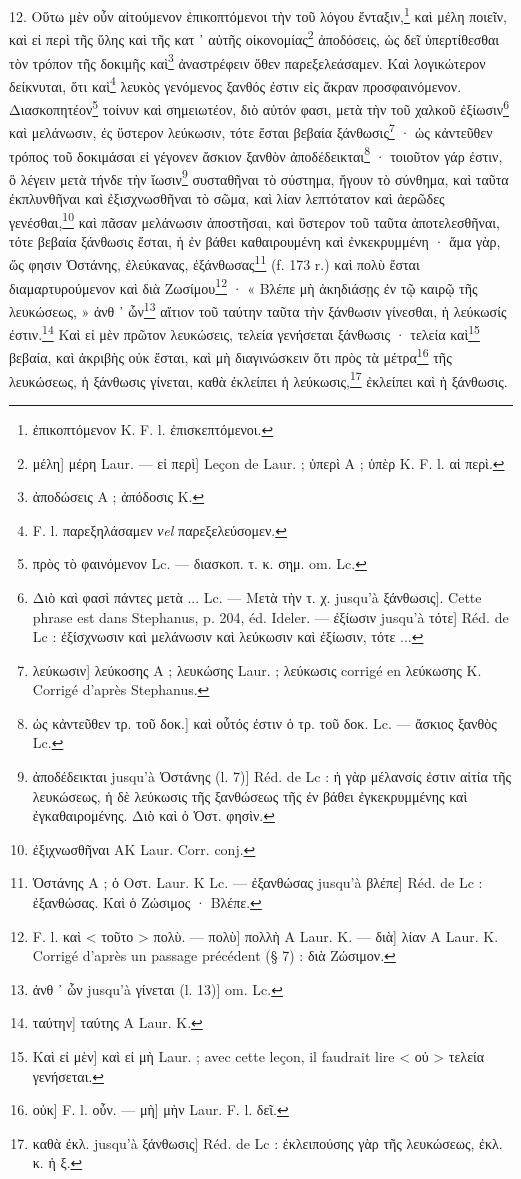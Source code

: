 \documentclass[a4paper, 11pt, oneside, polutonikogreek, french]{article}
\begin{document}
12. Οὕτω μὲν οὖν αἰτούμενον ἐπικοπτόμενοι τὴν τοῦ λόγου ἔνταξιν,\footnote{ἐπικοπτόμενον K. F. l. ἐπισκεπτόμενοι.} καὶ μέλη ποιεῖν, καὶ εἰ περὶ τῆς ὕλης καὶ τῆς κατ ᾽ αὐτῆς οἰκονομίας\footnote{μέλη] μέρη Laur. --- εἰ περὶ] Leçon de Laur. ; ὑπερὶ A ; ὑπὲρ K. F. l. αἱ περὶ.} ἀποδόσεις, ὡς δεῖ ὑπερτίθεσθαι τὸν τρόπον τῆς δοκιμῆς καὶ\footnote{ἀποδώσεις A ; ἀπόδοσις K.} ἀναστρέφειν ὅθεν παρεξελεάσαμεν. Καὶ λογικώτερον δείκνυται, ὅτι καὶ\footnote{F. l. παρεξηλάσαμεν \emph{νel} παρεξελεύσομεν.} λευκὸς γενόμενος ξανθός ἐστιν εἰς ἄκραν προσφαινόμενον. Διασκοπητέον\footnote{πρὸς τὸ φαινόμενον Lc. --- διασκοπ. τ. κ. σημ. om. Lc.} τοίνυν καὶ σημειωτέον, διὸ αὐτόν φασι, μετὰ τὴν τοῦ χαλκοῦ ἐξίωσιν\footnote{Διὸ καὶ φασὶ πάντες μετὰ ... Lc. --- Mετὰ τὴν τ. χ. jusqu'à ξάνθωσις]. Cette phrase est dans Stephanus, p. 204, éd. Ideler. --- ἐξίωσιν jusqu'à τότε] Réd. de Lc : ἐξίσχνωσιν καὶ μελάνωσιν καὶ λεύκωσιν καὶ ἐξίωσιν, τότε ...} καὶ μελάνωσιν, ἐς ὕστερον λεύκωσιν, τότε ἔσται βεβαία ξάνθωσις\footnote{λεύκωσιν] λεύκοσης A ; λευκώσης Laur. ; λεύκωσις corrigé en λεύκωσης K. Corrigé d'après Stephanus.} · ὡς κἀντεῦθεν τρόπος τοῦ δοκιμάσαι εἰ γέγονεν ἄσκιον ξανθὸν ἀποδέδεικται\footnote{ὡς κἀντεῦθεν τρ. τοῦ δοκ.] καὶ οὗτός ἐστιν ὁ τρ. τοῦ δοκ. Lc. --- ἄσκιος ξανθὸς Lc.} · τοιοῦτον γάρ ἐστιν, ὃ λέγειν μετὰ τήνδε τὴν ἴωσιν\footnote{ἀποδέδεικται jusqu'à Ὀστάνης (l. 7)] Réd. de Lc : ἡ γὰρ μέλανσίς ἐστιν αἰτία τῆς λευκώσεως, ἡ δὲ λεύκωσις τῆς ξανθώσεως τῆς ἐν βάθει ἐγκεκρυμμένης καὶ ἐγκαθαιρομένης. Διὸ καὶ ὁ Ὁστ. φησὶν.} συσταθῆναι τὸ σύστημα, ἤγουν τὸ σύνθημα, καὶ ταῦτα ἐκπλυνθῆναι καὶ ἐξισχνωσθῆναι τὸ σῶμα, καὶ λίαν λεπτότατον καὶ ἀερῶδες γενέσθαι,\footnote{ἐξιχνωσθῆναι AK Laur. Corr. conj.} καὶ πᾶσαν μελάνωσιν ἀποστῆσαι, καὶ ὕστερον τοῦ ταῦτα ἀποτελεσθῆναι, τότε βεβαία ξάνθωσις ἔσται, ἡ ἐν βάθει καθαιρουμένη καὶ ἐνκεκρυμμένη · ἅμα γὰρ, ὥς φησιν Ὀστάνης, ἐλεύκανας, ἐξάνθωσας\footnote{Ὁστάνης A ; ὁ Oστ. Laur. K Lc. --- ἐξανθώσας jusqu'à βλέπε] Réd. de Lc : ἐξανθώσας. Καὶ ὁ Ζώσιμος · Βλέπε.} (f. 173 r.) καὶ πολὺ ἔσται διαμαρτυρούμενον καὶ διὰ Ζωσίμου\footnote{F. l. καὶ < τοῦτο > πολὺ. --- πολὺ] πολλὴ A Laur. K. --- διὰ] λίαν A Laur. K. Corrigé d'après un passage précédent (§ 7) : διὰ Ζώσιμον.} · « Βλέπε μὴ ἀκηδιάσῃς ἐν τῷ καιρῷ τῆς λευκώσεως, » ἀνθ ᾽ ὧν\footnote{ἀνθ ᾽ ὧν jusqu'à γίνεται (l. 13)] om. Lc.} αἴτιον τοῦ ταύτην ταῦτα τὴν ξάνθωσιν γίνεσθαι, ἡ λεύκωσίς ἐστιν.\footnote{ταύτην] ταύτης A Laur. K.} Καὶ εἰ μὲν πρῶτον λευκώσεις, τελεία γενήσεται ξάνθωσις · τελεία καὶ\footnote{Καὶ εἰ μὲν] καὶ εἰ μὴ Laur. ; avec cette leçon, il faudrait lire < οὐ > τελεία γενήσεται.} βεβαία, καὶ ἀκριβὴς οὐκ ἔσται, καὶ μὴ διαγινώσκειν ὅτι πρὸς τὰ μέτρα\footnote{οὐκ] F. l. οὖν. --- μὴ] μὴν Laur. F. l. δεῖ.} τῆς λευκώσεως, ἡ ξάνθωσις γίνεται, καθὰ ἐκλείπει ἡ λεύκωσις,\footnote{καθὰ ἐκλ. jusqu'à ξάνθωσις] Réd. de Lc : ἐκλειπούσης γὰρ τῆς λευκώσεως, ἐκλ. κ. ἡ ξ.} ἐκλείπει καὶ ἡ ξάνθωσις.
\end{document}
